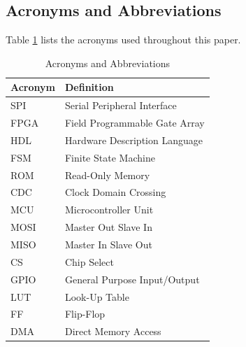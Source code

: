 \documentclass[conference]{IEEEtran}
\begin{document}
\begin{table}[H]
\caption{SPI Bus Controller Port Signal Descriptions}
\label{tab:signal_descriptions}
\centering
{}
\end{table}

\subsection{Acronyms and Abbreviations}
Table \ref{tab:abbreviations} lists the acronyms used throughout this paper.

\begin{table}[H]
\caption{Acronyms and Abbreviations}
\label{tab:abbreviations}
\centering
\begin{tabular}{ll}
\toprule
\textbf{Acronym} & \textbf{Definition} \\
\midrule
SPI & Serial Peripheral Interface \\
FPGA & Field Programmable Gate Array \\
HDL & Hardware Description Language \\
FSM & Finite State Machine \\
ROM & Read-Only Memory \\
CDC & Clock Domain Crossing \\
MCU & Microcontroller Unit \\
MOSI & Master Out Slave In \\
MISO & Master In Slave Out \\
CS & Chip Select \\
GPIO & General Purpose Input/Output \\
LUT & Look-Up Table \\
FF & Flip-Flop \\
DMA & Direct Memory Access \\
\bottomrule
\end{tabular}
\end{table}
\end{document}
